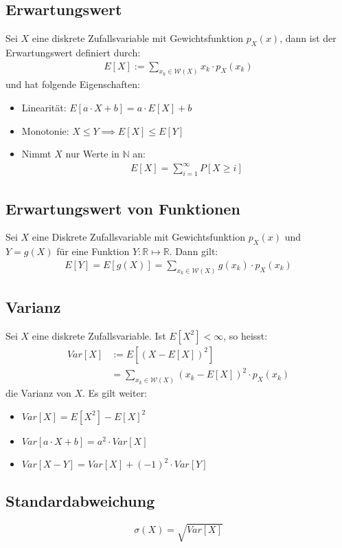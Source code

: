 \documentclass[8pt]{extarticle}
\newcommand{\N}{\mathbb{N}}
\newcommand{\R}{\mathbb{R}}
\newcommand{\W}{\mathcal{W}}
\newcommand{\Sinfty}{\sum_{i = 1}^\infty}
\begin{document}
\begin{multicols*}{3}
  \subsection*{Erwartungswert}
  Sei $X$ eine diskrete Zufallsvariable mit Gewichtsfunktion $p_X(x)$,
  dann ist der Erwartungswert definiert durch:
  \begin{align*}
    E[X] := \sum_{x_k \in \W(X)} x_k \cdot p_X(x_k)
  \end{align*}
  und hat folgende Eigenschaften:
  \begin{itemize}
    \item Linearität: $E[a \cdot X + b] = a \cdot E[X] + b$
    \item Monotonie: $X \leq Y \implies E[X] \leq E[Y]$
    \item Nimmt $X$ nur Werte in $\N $ an:
          \begin{align*}
            E[X] = \Sinfty P[X \geq i]
          \end{align*}
  \end{itemize}
  \subsection*{Erwartungswert von Funktionen}
  Sei $X$ eine Diskrete Zufallsvariable mit Gewichtsfunktion
  $p_X(x)$ und $Y = g(X)$ für eine Funktion $Y: \R \mapsto \R$.
  Dann gilt:
  \begin{align*}
    E[Y] = E[g(X)] = \sum_{x_k \in \W(X)} g(x_k) \cdot p_X(x_k)
  \end{align*}
  \subsection*{Varianz}
  Sei $X$ eine diskrete Zufallsvariable. Ist $E[X^2] < \infty$, so heisst:
  \begin{align*}
    Var[X] & := E[(X - E[X])^2]                                   \\
           & = \sum_{x_k \in \W(X)} (x_k - E[X])^2 \cdot p_X(x_k)
  \end{align*}
  die Varianz von $X$. Es gilt weiter:
  \begin{itemize}
    \item $Var[X] = E[X^2] - E[X]^2$
    \item $Var[a \cdot X + b] = a^2 \cdot Var[X]$
    \item $Var[X - Y] = Var[X] + (-1)^2 \cdot Var[Y]$
  \end{itemize}
  \subsection*{Standardabweichung}
  $$
    \sigma(X) = \sqrt{Var[X]}
  $$ 

\end{multicols*}
\end{document}
